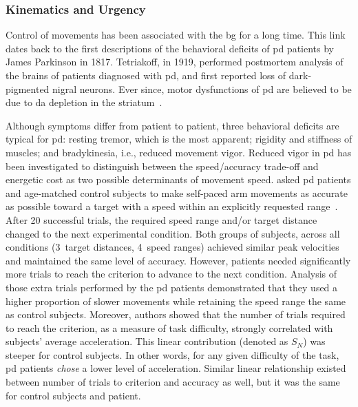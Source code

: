 \subsubsection{Kinematics and Urgency}
Control of movements has been associated with the \gls{bg} for a long time.
This link dates back to the first descriptions of the behavioral deficits of \gls{pd} patients by James Parkinson in 1817.
Tetriakoff, in 1919, performed postmortem analysis of the brains of patients diagnosed with \gls{pd}, and first reported loss of dark-pigmented nigral neurons.
Ever since, motor dysfunctions of \gls{pd} are believed to be due to \gls{da} depletion in the striatum~\cite{Hornykiewicz2006,McGregor2019Neuron,Redgrave2010, Panigrahi2015Cell}.
\par
Although symptoms differ from patient to patient, three behavioral deficits are typical for \gls{pd}:
    resting tremor, which is the most apparent;
    rigidity and stiffness of muscles;
    and bradykinesia, i.e., reduced movement vigor.
Reduced vigor in \gls{pd} has been investigated to distinguish between the speed/accuracy trade-off and energetic cost as two possible determinants of movement speed.
 asked \gls{pd} patients and age-matched control subjects to make self-paced arm movements as accurate as possible toward a target with a speed within an explicitly requested range~\cite{Mazzoni2007}.
After 20 successful trials, the required speed range and/or target distance changed to the next experimental condition.
Both groups of subjects, across all conditions (3~target distances, 4~speed ranges) achieved similar peak velocities and maintained the same level of accuracy.
However, patients needed significantly more trials to reach the criterion to advance to the next condition.
Analysis of those extra trials performed by the \gls{pd} patients demonstrated that they used a higher proportion of slower movements while retaining the speed range the same as control subjects.
Moreover, authors showed that the number of trials required to reach the criterion, as a measure of task difficulty, strongly correlated with subjects' average acceleration.
This linear contribution (denoted as $S_N$) was steeper for control subjects.
In other words, for any given difficulty of the task, \gls{pd} patients \textit{chose} a lower level of acceleration.
Similar linear relationship existed between number of trials to criterion and accuracy as well, but it was the same for control subjects and patient.
